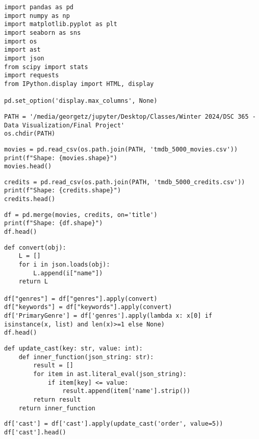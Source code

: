 \lstset{style=pythonstyle}
\begin{lstlisting}
import pandas as pd
import numpy as np
import matplotlib.pyplot as plt
import seaborn as sns
import os
import ast
import json
from scipy import stats
import requests
from IPython.display import HTML, display

pd.set_option('display.max_columns', None)
\end{lstlisting}

\begin{lstlisting}
PATH = '/media/georgetz/jupyter/Desktop/Classes/Winter 2024/DSC 365 - Data Visualization/Final Project'
os.chdir(PATH)
\end{lstlisting}

\begin{lstlisting}
movies = pd.read_csv(os.path.join(PATH, 'tmdb_5000_movies.csv'))
print(f"Shape: {movies.shape}")
movies.head()
\end{lstlisting}

\begin{lstlisting}
credits = pd.read_csv(os.path.join(PATH, 'tmdb_5000_credits.csv'))
print(f"Shape: {credits.shape}")
credits.head()
\end{lstlisting}

\begin{lstlisting}
df = pd.merge(movies, credits, on='title')
print(f"Shape: {df.shape}")
df.head()
\end{lstlisting}

\begin{lstlisting}
def convert(obj):
    L = []
    for i in json.loads(obj):
        L.append(i["name"])
    return L

df["genres"] = df["genres"].apply(convert)
df["keywords"] = df["keywords"].apply(convert)
df['PrimaryGenre'] = df['genres'].apply(lambda x: x[0] if isinstance(x, list) and len(x)>=1 else None)
df.head()
\end{lstlisting}

\begin{lstlisting}
def update_cast(key: str, value: int):
    def inner_function(json_string: str):
        result = []
        for item in ast.literal_eval(json_string):
            if item[key] <= value:
                result.append(item['name'].strip())
        return result
    return inner_function
\end{lstlisting}

\begin{lstlisting}
df['cast'] = df['cast'].apply(update_cast('order', value=5))
df['cast'].head()
\end{lstlisting}

